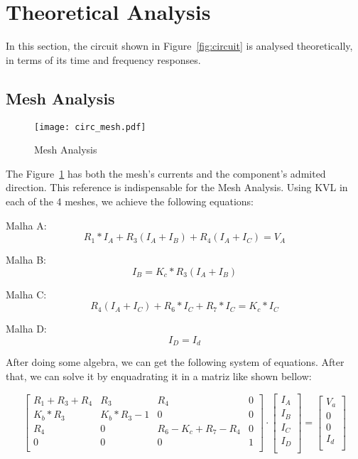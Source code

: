 \section{Theoretical Analysis}
\label{sec:analysis}

In this section, the circuit shown in Figure~\ref{fig:circuit} is analysed
theoretically, in terms of its time and frequency responses.

\subsection{Mesh Analysis}

\begin{figure}[h!] \centering
	\texttt{[image: circ\_mesh.pdf]}
	\caption{Mesh Analysis}
	\label{fig:circuitMesh}
\end{figure}

The Figure~\ref{fig:circuitMesh} has both the mesh's currents and the 
component's admited direction.
This reference is indispensable for the Mesh Analysis.
Using KVL in each of the 4 meshes, we achieve the following equations:
\vspace{0.5cm}

Malha A:
$$ R_1 * I_A + R_3(I_A+I_B) + R_4(I_A+I_C) = V_A$$

Malha B:
$$ I_B = K_c * R_3(I_A + I_B) $$

Malha C:
$$ R_4(I_A + I_C) + R_6 * I_C + R_7 * I_C = K_c * I_C $$

Malha D:
$$ I_D = I_d $$

\vspace{0.5cm}

After doing some algebra, we can get the following system of equations. After that, 
we can solve it by enquadrating it in a matriz like shown bellow:

\vspace{0.5cm}

\[
\begin{bmatrix}
R_1 + R_3 + R_4 & R_3 & R_4 & 0\\
K_b * R_3 & K_b * R_3 - 1 & 0 & 0\\
R_4 & 0 & R_6 - K_c + R_7 - R_4 & 0\\
0 & 0 & 0 & 1\\
\end{bmatrix}
\cdot
\begin{bmatrix}
I_A\\
I_B\\
I_C\\
I_D\\
\end{bmatrix}
=
\begin{bmatrix}
V_a\\
0\\
0\\
I_d\\
\end{bmatrix}
\]

